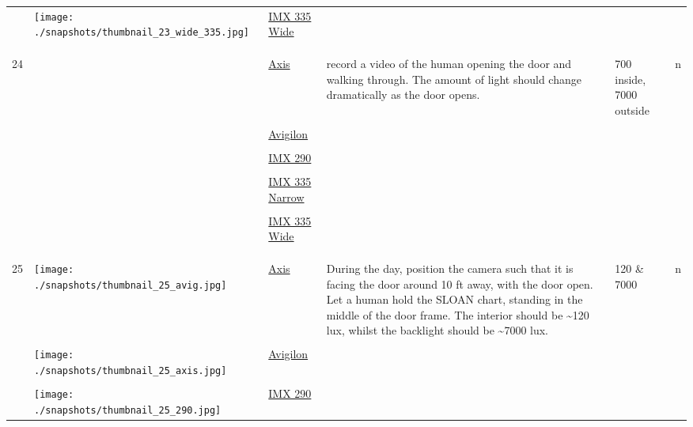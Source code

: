 \documentclass{article}%
\begin{document}
\begin{longtabu}{m{2.5cm} m{4cm} m{2cm} m{4cm} m{2cm} m{2cm}}
&\texttt{[image: ./snapshots/thumbnail\_23\_wide\_335.jpg]}&\href{https://drive.google.com/file/d/1gd1tsMKcqEoZf9R46AxxJIV6uYMmlMj2/view?usp=sharing}{IMX 335 Wide}&&&\\%
&&&&&\\%
&&&&&\\%
\hline%
&&&&&\\%
24&&\href{https://drive.google.com/file/d/1KPW1iFRglgTPQaXkRlsUPpdjSVrrU_T_/view?usp=sharing}{Axis}&record a video of the human opening the door and walking through. The amount of light should change dramatically as the door opens.&700 inside, 7000 outside&n\\%
&&&&&\\%
&&\href{https://drive.google.com/file/d/1Tc-VdHU0osDnvbnHajqHonehkyZojvW2/view?usp=sharing}{Avigilon}&&&\\%
&&&&&\\%
&&\href{https://drive.google.com/file/d/1k_Xo_q9Ldju17LUaAUg3N2GJYu-PmtdS/view?usp=sharing}{IMX 290}&&&\\%
&&&&&\\%
&&\href{https://drive.google.com/file/d/1I_7PAGAjakbe8yZqiDiB3ksvVR5labWO/view?usp=sharing}{IMX 335 Narrow}&&&\\%
&&&&&\\%
&&\href{https://drive.google.com/file/d/1EAYG8vQJDFLacdg6g0EUFO7croadEjR0/view?usp=sharing}{IMX 335 Wide}&&&\\%
&&&&&\\%
&&&&&\\%
\hline%
&&&&&\\%
25&\texttt{[image: ./snapshots/thumbnail\_25\_avig.jpg]}&\href{https://drive.google.com/file/d/1lv3zSZpoQ6aVCikEorZkEftZq-EzGMFj/view?usp=sharing}{Axis}&During the day, position the camera such that it is facing the door around 10 ft away, with the door open. Let a human hold the SLOAN chart, standing in the middle of the door frame. The interior should be \textasciitilde{}120 lux, whilst the backlight should be \textasciitilde{}7000 lux.&120 \& 7000&n\\%
&&&&&\\%
&\texttt{[image: ./snapshots/thumbnail\_25\_axis.jpg]}&\href{https://drive.google.com/file/d/1ON2mneT5gTb-Y2wcYqsojQhlrC5ofVdA/view?usp=sharing}{Avigilon}&&&\\%
&&&&&\\%
&\texttt{[image: ./snapshots/thumbnail\_25\_290.jpg]}&\href{https://drive.google.com/file/d/1GSdhts3Y4BT9y1tMM7VcQX0-blKp8bXr/view?usp=sharing}{IMX 290}&&&\\%

\end{longtabu}
\end{document}
